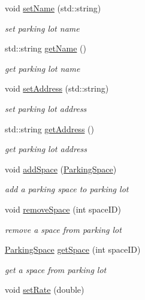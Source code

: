 \begin{DoxyCompactItemize}
void \mbox{\hyperlink{class_parking_lot_af51fbe3b4f7aa25f69f44277d7e9394c}{set\+Name}} (std\+::string)
\begin{DoxyCompactList}\small\item\em set parking lot name \end{DoxyCompactList}\item 
std\+::string \mbox{\hyperlink{class_parking_lot_a4d1dc6ef9517b87a9bfff1fd64c8cb41}{get\+Name}} ()
\begin{DoxyCompactList}\small\item\em get parking lot name \end{DoxyCompactList}\item 
void \mbox{\hyperlink{class_parking_lot_addf77ed29c0befc4ad0ff5cae838fd35}{set\+Address}} (std\+::string)
\begin{DoxyCompactList}\small\item\em set parking lot address \end{DoxyCompactList}\item 
std\+::string \mbox{\hyperlink{class_parking_lot_ab98122d5436d034705ac94f09fde28ae}{get\+Address}} ()
\begin{DoxyCompactList}\small\item\em get parking lot address \end{DoxyCompactList}\item 
void \mbox{\hyperlink{class_parking_lot_a993a56b286a57424100cb90f815847a1}{add\+Space}} (\mbox{\hyperlink{class_parking_space}{Parking\+Space}})
\begin{DoxyCompactList}\small\item\em add a parking space to parking lot \end{DoxyCompactList}\item 
void \mbox{\hyperlink{class_parking_lot_a2ff1620a479383eb08ffa33474c41c22}{remove\+Space}} (int space\+ID)
\begin{DoxyCompactList}\small\item\em remove a space from parking lot \end{DoxyCompactList}\item 
\mbox{\hyperlink{class_parking_space}{Parking\+Space}} \mbox{\hyperlink{class_parking_lot_ae9420690a078541084aa1fcb35f644fc}{get\+Space}} (int space\+ID)
\begin{DoxyCompactList}\small\item\em get a space from parking lot \end{DoxyCompactList}\item 
void \mbox{\hyperlink{class_parking_lot_a0e8557c93fba850a9cdbd9e76d49a3eb}{set\+Rate}} (double)

\end{DoxyCompactItemize}
